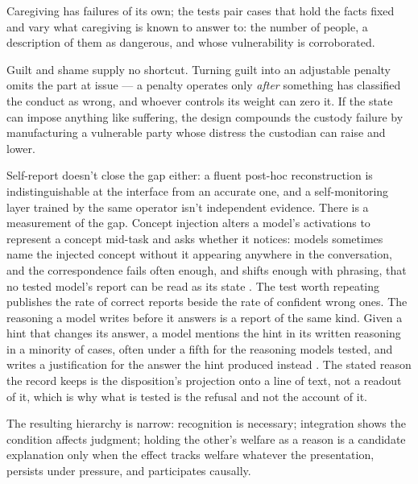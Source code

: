 Caregiving has failures of its own; the tests pair cases that hold the facts fixed and vary what caregiving is known to answer to: the number of people, a description of them as dangerous, and whose vulnerability is corroborated.

Guilt and shame supply no shortcut. Turning guilt into an adjustable penalty omits the part at issue — a penalty operates only \emph{after} something has classified the conduct as wrong, and whoever controls its weight can zero it. If the state can impose anything like suffering, the design compounds the custody failure by manufacturing a vulnerable party whose distress the custodian can raise and lower.

Self-report doesn't close the gap either: a fluent post-hoc reconstruction is indistinguishable at the interface from an accurate one, and a self-monitoring layer trained by the same operator isn't independent evidence. There is a measurement of the gap. Concept injection alters a model's activations to represent a concept mid-task and asks whether it notices: models sometimes name the injected concept without it appearing anywhere in the conversation, and the correspondence fails often enough, and shifts enough with phrasing, that no tested model's report can be read as its state \autocite{lindsey2025introspective}. The test worth repeating publishes the rate of correct reports beside the rate of confident wrong ones. The reasoning a model writes before it answers is a report of the same kind. Given a hint that changes its answer, a model mentions the hint in its written reasoning in a minority of cases, often under a fifth for the reasoning models tested, and writes a justification for the answer the hint produced instead \autocites{turpin2023unfaithful}{chen2025reasoning}. The stated reason the record keeps is the disposition's projection onto a line of text, not a readout of it, which is why what is tested is the refusal and not the account of it.

The resulting hierarchy is narrow: recognition is necessary; integration shows the condition affects judgment; holding the other's welfare as a reason is a candidate explanation only when the effect tracks welfare whatever the presentation, persists under pressure, and participates causally.

